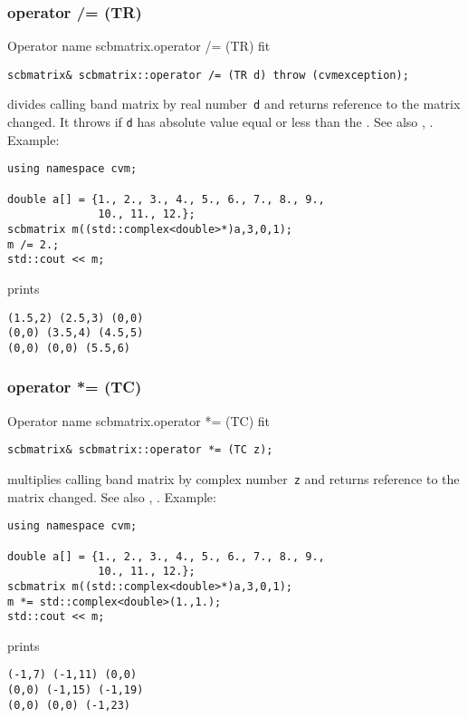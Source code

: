 \subsubsection{operator /= (TR)}
Operator%
\pdfdest name {scbmatrix.operator /= (TR)} fit
\begin{verbatim}
scbmatrix& scbmatrix::operator /= (TR d) throw (cvmexception);
\end{verbatim}
divides  calling band matrix by  real number~\verb"d"
and returns  reference to
the matrix changed.
It throws  
if \verb"d" has  absolute value equal or less
than the 
.
See also ,
.
Example:
\begin{Verbatim}
using namespace cvm;

double a[] = {1., 2., 3., 4., 5., 6., 7., 8., 9.,
              10., 11., 12.};
scbmatrix m((std::complex<double>*)a,3,0,1);
m /= 2.;
std::cout << m;
\end{Verbatim}
prints
\begin{Verbatim}
(1.5,2) (2.5,3) (0,0)
(0,0) (3.5,4) (4.5,5)
(0,0) (0,0) (5.5,6)
\end{Verbatim}
\newpage




\subsubsection{operator *= (TC)}
Operator%
\pdfdest name {scbmatrix.operator *= (TC)} fit
\begin{verbatim}
scbmatrix& scbmatrix::operator *= (TC z);
\end{verbatim}
multiplies  calling band matrix by  complex number~\verb"z"
and returns  reference to
the matrix changed.
See also ,
.
Example:
\begin{Verbatim}
using namespace cvm;

double a[] = {1., 2., 3., 4., 5., 6., 7., 8., 9.,
              10., 11., 12.};
scbmatrix m((std::complex<double>*)a,3,0,1);
m *= std::complex<double>(1.,1.);
std::cout << m;
\end{Verbatim}
prints
\begin{Verbatim}
(-1,7) (-1,11) (0,0)
(0,0) (-1,15) (-1,19)
(0,0) (0,0) (-1,23)
\end{Verbatim}
\newpage



